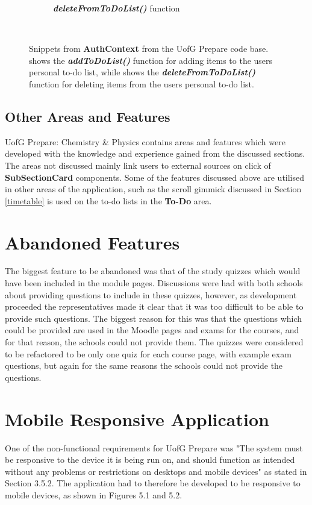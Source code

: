 \documentclass{l4proj}
\begin{document}
\begin{figure}[ht]
\begin{subfigure}[b]{0.48\textwidth}
        \caption{\textbf{\textit{deleteFromToDoList()}} function}
        \label{fig:toggleAll}
    \end{subfigure}
    ~ %
    \caption{Snippets from \textbf{AuthContext} from the UofG Prepare code base.  shows the \textbf{\textit{addToDoList()}} function for adding items to the users personal to-do list,  while  shows the \textbf{\textit{deleteFromToDoList()}} function for deleting items from the users personal to-do list.
    }\label{fig:editToDo}
\end{figure}

\subsection{Other Areas and Features}
UofG Prepare: Chemistry \& Physics contains areas and features which were developed with the knowledge and experience gained from the discussed sections. The areas not discussed mainly link users to external sources on click of \textbf{SubSectionCard} components. Some of the features discussed above are utilised in other areas of the application,  such as the scroll gimmick discussed in Section \ref{timetable} is used on the to-do lists in the \textbf{To-Do} area.

\section{Abandoned Features}
The biggest feature to be abandoned was that of the study quizzes which would have been included in the module pages. Discussions were had with both schools about providing questions to include in these quizzes,  however,  as development proceeded the representatives made it clear that it was too difficult to be able to provide such questions. The biggest reason for this was that the questions which could be provided are used in the Moodle pages and exams for the courses,  and for that reason,  the schools could not provide them. The quizzes were considered to be refactored to be only one quiz for each course page,  with example exam questions,  but again for the same reasons the schools could not provide the questions.

\section{Mobile Responsive Application}
One of the non-functional requirements for UofG Prepare was "The system must be responsive to the device it is being run on,  and should function as intended without any problems or restrictions on desktops and mobile devices" as stated in Section 3.5.2. The application had to therefore be developed to be responsive to mobile devices,  as shown in Figures 5.1  and 5.2.
\end{document}
